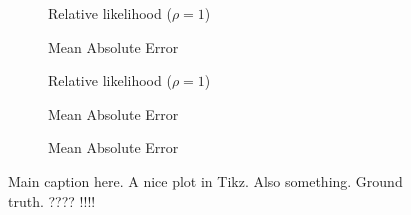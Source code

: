 \begin{figure}[!t]\centering
    \begin{subfigure}[]{0.5\linewidth}\centering %
        
        \vspace{-18pt}
        \caption{Relative likelihood ($\rho = 1$)}
        \label{fig:sub_label_a}
    \end{subfigure}\hfill %
    \begin{subfigure}[]{0.5\linewidth}\centering
        
        \vspace{-18pt}
        \caption{Mean Absolute Error}
        \label{fig:sub_label_b}
    \end{subfigure}\vfill %
    \begin{subfigure}[]{0.33\linewidth}\centering %
        
        \vspace{-18pt}
        \caption{Relative likelihood ($\rho = 1$)}
        \label{fig:sub_label_c}
    \end{subfigure}\hfill %
    \begin{subfigure}[]{0.33\linewidth}\centering
        
        \vspace{-18pt}
        \caption{Mean Absolute Error}
        \label{fig:sub_label_d}
    \end{subfigure}\hfill
    \begin{subfigure}[]{0.33\linewidth}\centering
        
        \vspace{-18pt}
        \caption{Mean Absolute Error}
        \label{fig:sub_label_e}
    \end{subfigure}%
    \caption{Main caption here.  A nice plot in Tikz.  Also something.  Ground truth.  ????  !!!!}
    \label{fig:subfig}
\end{figure}


